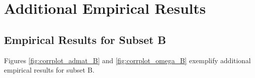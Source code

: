 \section{Additional Empirical Results}

\subsection*{Empirical Results for Subset B}
Figures \ref{fig:corrplot_admat_B} and \ref{fig:corrplot_omega_B} exemplify additional empirical results for subset B. 

